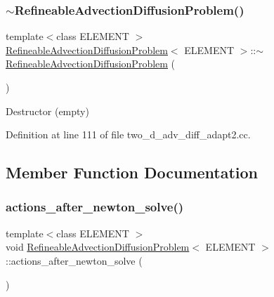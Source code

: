 \subsubsection{\texorpdfstring{$\sim$\+Refineable\+Advection\+Diffusion\+Problem()}{~RefineableAdvectionDiffusionProblem()}\hspace{0.1cm}{\footnotesize\ttfamily [2/2]}}
{\footnotesize\ttfamily template$<$class E\+L\+E\+M\+E\+NT $>$ \\
\hyperlink{classRefineableAdvectionDiffusionProblem}{Refineable\+Advection\+Diffusion\+Problem}$<$ E\+L\+E\+M\+E\+NT $>$\+::$\sim$\hyperlink{classRefineableAdvectionDiffusionProblem}{Refineable\+Advection\+Diffusion\+Problem} (\begin{DoxyParamCaption}{ }\end{DoxyParamCaption})\hspace{0.3cm}{\ttfamily [inline]}}



Destructor (empty) 



Definition at line 111 of file two\+\_\+d\+\_\+adv\+\_\+diff\+\_\+adapt2.\+cc.



\subsection{Member Function Documentation}
\mbox{\label{classRefineableAdvectionDiffusionProblem_a949296e60bc661fbd523974055a93f8b}} 
\subsubsection{\texorpdfstring{actions\+\_\+after\+\_\+newton\+\_\+solve()}{actions\_after\_newton\_solve()}\hspace{0.1cm}{\footnotesize\ttfamily [1/2]}}
{\footnotesize\ttfamily template$<$class E\+L\+E\+M\+E\+NT $>$ \\
void \hyperlink{classRefineableAdvectionDiffusionProblem}{Refineable\+Advection\+Diffusion\+Problem}$<$ E\+L\+E\+M\+E\+NT $>$\+::actions\+\_\+after\+\_\+newton\+\_\+solve (\begin{DoxyParamCaption}{ }\end{DoxyParamCaption})\hspace{0.3cm}{\ttfamily [inline]}}



